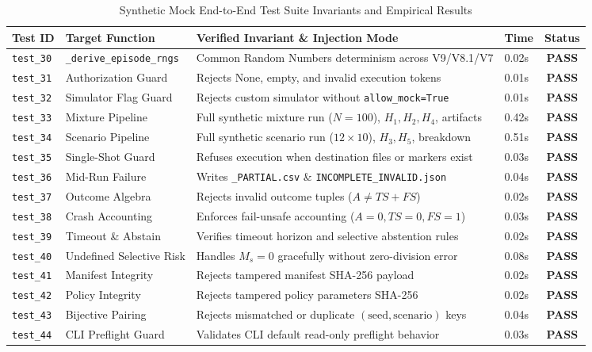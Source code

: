 \documentclass[10pt,a4paper]{article}
\begin{document}
\begin{table}[htbp]
\centering
\small
\caption{Synthetic Mock End-to-End Test Suite Invariants and Empirical Results}
\label{tab:mock_tests}
\begin{tabularx}{\textwidth}{llXlc}
\toprule
\textbf{Test ID} & \textbf{Target Function} & \textbf{Verified Invariant \& Injection Mode} & \textbf{Time} & \textbf{Status} \\
\midrule
\texttt{test\_30} & \texttt{\_derive\_episode\_rngs} & Common Random Numbers determinism across V9/V8.1/V7 & 0.02s & \textbf{PASS} \\
\texttt{test\_31} & Authorization Guard & Rejects None, empty, and invalid execution tokens & 0.01s & \textbf{PASS} \\
\texttt{test\_32} & Simulator Flag Guard & Rejects custom simulator without \texttt{allow\_mock=True} & 0.01s & \textbf{PASS} \\
\texttt{test\_33} & Mixture Pipeline & Full synthetic mixture run ($N=100$), $H_1, H_2, H_4$, artifacts & 0.42s & \textbf{PASS} \\
\texttt{test\_34} & Scenario Pipeline & Full synthetic scenario run ($12 \times 10$), $H_3, H_5$, breakdown & 0.51s & \textbf{PASS} \\
\texttt{test\_35} & Single-Shot Guard & Refuses execution when destination files or markers exist & 0.03s & \textbf{PASS} \\
\texttt{test\_36} & Mid-Run Failure & Writes \texttt{\_PARTIAL.csv} \& \texttt{INCOMPLETE\_INVALID.json} & 0.04s & \textbf{PASS} \\
\texttt{test\_37} & Outcome Algebra & Rejects invalid outcome tuples ($A \ne TS + FS$) & 0.02s & \textbf{PASS} \\
\texttt{test\_38} & Crash Accounting & Enforces fail-unsafe accounting ($A=0, TS=0, FS=1$) & 0.03s & \textbf{PASS} \\
\texttt{test\_39} & Timeout \& Abstain & Verifies timeout horizon and selective abstention rules & 0.02s & \textbf{PASS} \\
\texttt{test\_40} & Undefined Selective Risk & Handles $M_s = 0$ gracefully without zero-division error & 0.08s & \textbf{PASS} \\
\texttt{test\_41} & Manifest Integrity & Rejects tampered manifest SHA-256 payload & 0.02s & \textbf{PASS} \\
\texttt{test\_42} & Policy Integrity & Rejects tampered policy parameters SHA-256 & 0.02s & \textbf{PASS} \\
\texttt{test\_43} & Bijective Pairing & Rejects mismatched or duplicate $(\text{seed}, \text{scenario})$ keys & 0.04s & \textbf{PASS} \\
\texttt{test\_44} & CLI Preflight Guard & Validates CLI default read-only preflight behavior & 0.03s & \textbf{PASS} \\
\bottomrule
\end{tabularx}
\end{table}
\end{document}
